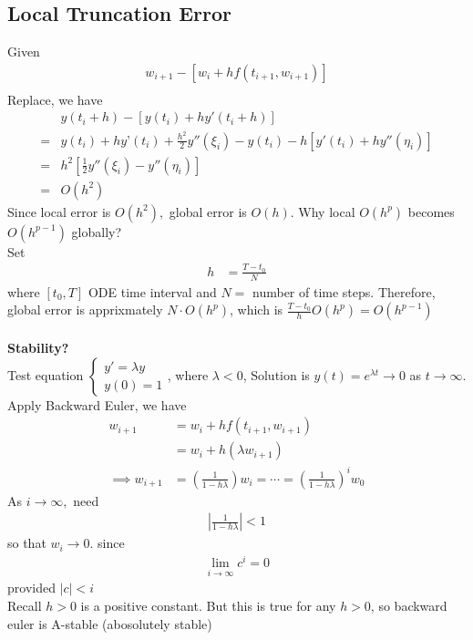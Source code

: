 \documentclass[11pt,oneside]{book}
\theoremstyle{break}
\theoremstyle{break}
\begin{document}
\subsection[Local Truncation Error]{Local Truncation Error}
Given \begin{align*}
w_{i+1}-[w_i+hf(t_{i+1},w_{i+1})]\\
\end{align*}
Replace, we have \begin{align*}
&y(t_i+h)-[y(t_i)+hy'(t_i+h)]\\
=&y(t_i)+hy’(t_i)+\frac{h^2}{2}y''(\xi_i)-y(t_i)-h[y'(t_i)+hy''(\eta_i)]\\
=&h^2[\frac{1}{2}y''(\xi_i)-y''(\eta_i)]\\
=&O(h^2)
\end{align*}
Since local error is $O(h^2),$ global error is $O(h)$. Why local $O(h^p)$ becomes $O(h^{p-1})$ globally?\\
Set \begin{align*}
h&=\frac{T-t_0}{N}
\end{align*}
where $[t_0,T]$ ODE time interval and $N=$ number of time steps. Therefore, global error is apprixmately $N\cdot O(h^p)$, which is $\frac{T-t_0}{h}O(h^p)=O(h^{p-1})$\\
\hfill\\
\textbf{Stability?}\\
Test equation $
\begin{cases}
y'=\lambda y\\
y(0)=1
\end{cases}$, where $\lambda<0$, Solution is $y(t)=e^{\lambda t}\to 0$ as $t\to \infty$.\\
Apply Backward Euler,  we have \begin{align*}
w_{i+1}&=w_i+hf(t_{i+1},w_{i+1})\\
&=w_{i}+h(\lambda w_{i+1})\\
\implies w_{i+1}&=\left(\frac{1}{1-h\lambda} \right)w_i=\cdots=\left(\frac{1}{1-h\lambda} \right)^iw_0
\end{align*}
As $i\to \infty,$ need \begin{align*}
|\frac{1}{1-h\lambda}|<1
\end{align*}
so that $w_i\to 0$.
since \begin{align*}
\lim_{i\to \infty}c^i=0
\end{align*}
provided $|c|<i$\\
 Recall $h>0$ is a positive constant. But this is true for any $h>0$, so backward euler is A-stable (abosolutely stable)
\end{document}
